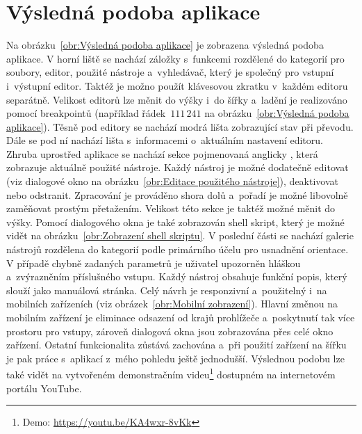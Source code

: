 \section{Výsledná podoba aplikace}
\label{sec:Výsledná podoba aplikace}
Na obrázku~\ref{obr:Výsledná podoba aplikace} je zobrazena výsledná podoba aplikace. V horní liště se nachází záložky s~funkcemi rozdělené do kategorií pro soubory, editor, použité nástroje a~vyhledávač, který je společný pro vstupní i~výstupní editor. Taktéž je možno použít klávesovou zkratku   v~každém editoru separátně. Velikost editorů lze měnit do výšky i~do šířky a~ladění je realizováno pomocí breakpointů (například řádek~$111\,241$ na obrázku~\ref{obr:Výsledná podoba aplikace}). Těsně pod editory se nachází modrá lišta zobrazující stav při převodu. Dále se pod ní nachází lišta s~informacemi o~aktuálním nastavení editoru. Zhruba uprostřed aplikace se nachází sekce pojmenovaná anglicky , která zobrazuje aktuálně použité nástroje. Každý nástroj je možné dodatečně editovat (viz dialogové okno na obrázku~\ref{obr:Editace použitého nástroje}), deaktivovat nebo odstranit. Zpracování je prováděno shora dolů a~pořadí je možné libovolně zaměňovat prostým přetažením. Velikost této sekce je taktéž možné měnit do výšky. Pomocí dialogového okna je také zobrazován shell skript, který je možné vidět na obrázku~\ref{obr:Zobrazení shell skriptu}. V poslední části se nachází galerie nástrojů rozdělena do kategorií podle primárního účelu pro usnadnění orientace. V případě chybně zadaných parametrů je uživatel upozorněn hláškou a~zvýrazněním příslušného vstupu. Každý nástroj obsahuje funkční popis, který slouží jako manuálová stránka. Celý návrh je responzivní a~použitelný i~na mobilních zařízeních (viz obrázek~\ref{obr:Mobilní zobrazení}). Hlavní změnou na mobilním zařízení je eliminace odsazení od krajů prohlížeče a~poskytnutí tak více prostoru pro vstupy, zároveň dialogová okna jsou zobrazována přes celé okno zařízení. Ostatní funkcionalita zůstává zachována a~při použití zařízení na šířku je pak práce s~aplikací z~mého pohledu ještě jednodušší. Výslednou podobu lze také vidět na vytvořeném demonstračním videu\footnote{Demo: \url{https://youtu.be/KA4wxr-8vKk}} dostupném na internetovém portálu YouTube.
